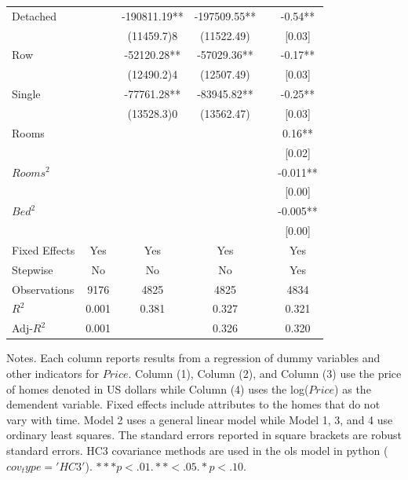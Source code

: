 \documentclass[12pt]{report}
\begin{document}
\begin{table}[h!]
\begin{threeparttable}
\begin{tabular}{lccccc}
Detached&	&	-190811.19\footnotesize***& -197509.55\footnotesize***&&	-0.54\footnotesize*** \\
&	&	\footnotesize(11459.7)8&	\footnotesize(11522.49)&&	\footnotesize[0.03] \\
Row&	 &	-52120.28\footnotesize***&	-57029.36\footnotesize***&& 	-0.17\footnotesize*** \\
&	&	\footnotesize(12490.2)4&	\footnotesize(12507.49)&&	\footnotesize[0.03] \\
Single&	&	-77761.28\footnotesize***&	-83945.82\footnotesize***&&	-0.25\footnotesize*** \\
&	&	\footnotesize(13528.3)0&	\footnotesize(13562.47)&&	\footnotesize[0.03]\\
Rooms&	&	&	&&	0.16\footnotesize***\\
&	&	&	&&	\footnotesize[0.02] \\
$Rooms^2$&	&	&	&&	-0.011\footnotesize*** \\
&	&	&	&&	\footnotesize[0.00] \\
$Bed^2$&	&	&	&&	-0.005\footnotesize*** \\
&	&	&&	&	\footnotesize[0.00] \\
Fixed Effects &       Yes&             Yes &                  Yes &  &                       Yes    \\ [0.5ex]
Stepwise &       No&             No &                   No &  &                      Yes    \\ [0.5ex]
Observations&            9176 &           4825&                  4825   &&                         4834      \\ [0.5ex]
$R^2$ &                     0.001 &          0.381&                   0.327 &&                      0.321 \\ [0.5ex]
Adj-$R^2$&                 0.001&        &                  0.326 &  &                   0.320   \\ [0.5ex]
\hline
\bottomrule
\end{tabular}
\begin{tablenotes}
  
 \item \footnotesize{Notes. Each column reports results from a regression of dummy variables and other indicators for $Price$. Column (1),  Column (2), and Column (3) use the price of homes denoted in US dollars while Column (4) uses the log($Price$) as the demendent variable. Fixed effects include attributes to the homes that do not vary with time. Model 2 uses a general linear model while Model 1, 3, and 4 use ordinary least squares. The standard errors reported in square brackets  are robust standard errors. HC3 covariance methods are used in the ols model in python ($cov_type='HC3'$). $***p<.01. **<.05. *p<.10.$}

\end{tablenotes}
\label{table:2}
\end{threeparttable}
\end{table}
\clearpage
\end{document}
